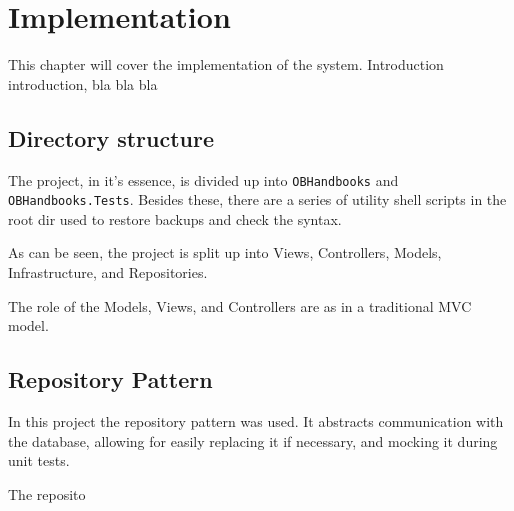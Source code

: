 \chapter{Implementation}
This chapter will cover the implementation of the system. Introduction introduction, bla bla bla
\section{Directory structure}
The project, in it's essence, is divided up into \texttt{OBHandbooks} and \texttt{OBHandbooks.Tests}. Besides these, there are a series of utility shell scripts in the root dir used to restore backups and check the syntax.

As can be seen, the project is split up into Views, Controllers, Models, Infrastructure, and Repositories.

The role of the Models, Views, and Controllers are as in a traditional MVC model.

\section{Repository Pattern}
In this project the repository pattern was used. It abstracts communication with the database, allowing for easily replacing it if necessary, and mocking it during unit tests.

The reposito


